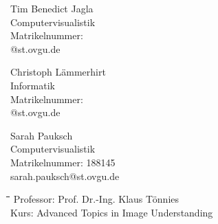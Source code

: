 \documentclass[liststotoc,11pt,a4paper]{article}
\begin{document}
\begin{figure}[htbp]
\begin{minipage}[t]{4.8cm}
\begin{flushleft}
Tim Benedict Jagla \\
Computervisualistik\\
Matrikelnummer:\\ 
@st.ovgu.de
\end{flushleft}
\end{minipage}
\hfill
\begin{minipage}[t]{4.8cm}
\begin{flushleft}
Christoph Lämmerhirt \\
Informatik\\
Matrikelnummer: \\
@st.ovgu.de
\end{flushleft}
\end{minipage}
\hfill
\begin{minipage}[t]{4.8cm}
\begin{flushleft} 
Sarah Pauksch \\
Computervisualistik\\
Matrikelnummer: 188145\\ 
sarah.pauksch@st.ovgu.de
\end{flushleft}
\end{minipage}
\end{figure}

\vspace{\fill}

\begin{figure}[htbp]
\begin{minipage}[b]{0.475\textwidth}
\vspace{0pt}
\begin{flushright}    
\begin {tabbing}
\hspace*{5cm}\=\hspace{2,5cm}\=\hspace{5cm}\=\hspace{2.5cm}\=\hspace{2.5cm}\=\kill
Professor:	\>Prof. Dr.-Ing. Klaus Tönnies\\
Kurs: \>Advanced Topics in Image Understanding\\

\end{tabbing}
\end{flushright}
\end{minipage}
\hfill
\begin{minipage}[b]{0.475\textwidth}
\centering
\end{minipage}
\end{figure}
\end{document}
